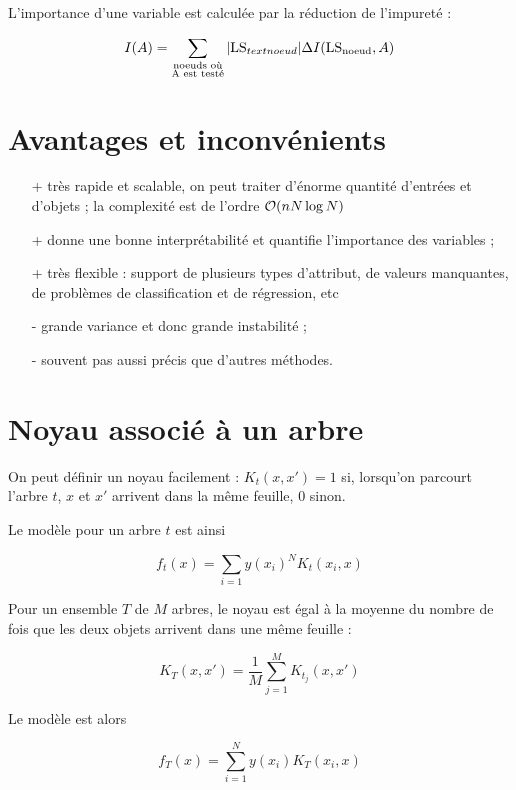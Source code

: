 	L'importance d'une variable est calculée par la réduction de l'impureté :
	
	$$I(A) = \sum_{\substack{\text{noeuds où} \\ \text{A est testé}}} \vert \text{LS}_{text{noeud}} \vert \Delta I(\text{LS}_{\text{noeud}}, A)$$
	
	
	\section{Avantages et inconvénients}
	
	\begin{itemize}
		\item[+] très rapide et scalable, on peut traiter d'énorme quantité d'entrées et d'objets ; la complexité est de l'ordre $\mathcal{O} (nN\log N)$
		\item[+] donne une bonne interprétabilité et quantifie l'importance des variables ;
		\item[+] très flexible : support de plusieurs types d'attribut, de valeurs manquantes, de problèmes de classification et de régression, etc
		\item[-] grande variance et donc grande instabilité ;
		\item[-] souvent pas aussi précis que d'autres méthodes.
	\end{itemize}
	

	\section{Noyau associé à un arbre}
	
	On peut définir un noyau facilement : $K_t(x, x') = 1$ si, lorsqu'on parcourt l'arbre $t$, $x$ et $x'$ arrivent dans la même feuille, $0$ sinon.
	
	Le modèle pour un arbre $t$ est ainsi
	
	$$f_t(x) = \sum_{i = 1} y(x_i)^N K_t(x_i, x)$$
	
	Pour un ensemble $T$ de $M$ arbres, le noyau est égal à la moyenne du nombre de fois que les deux objets arrivent dans une même feuille :
	
	$$K_T(x, x') = \frac{1}{M} \sum_{j = 1}^M K_{t_j}(x, x')$$
	
	Le modèle est alors
	
	$$f_T(x) = \sum_{i = 1}^N y(x_i) K_T(x_i, x)$$